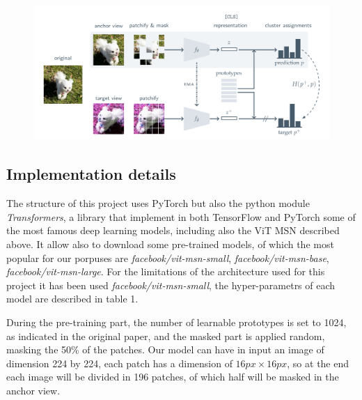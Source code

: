 \documentclass[column]{article}
\begin{document}
	
	\begin{figure}[h]
		\centering
		\includegraphics[width=\textwidth]{Images/screenshot001}
		\caption[MSN workflow]{}
		\label{fig:screenshot001}
	\end{figure}
	
	\begin{multicols}{2}
		
		
	\section{Implementation details}
	
	The structure of this project uses PyTorch but also the python module \textit{Transformers}, a library that implement in both TensorFlow and PyTorch some of the most famous deep learning models, including also
	the ViT MSN described above. It allow also to download some pre-trained models, of which the most popular for our porpuses are \textit{facebook/vit-msn-small}, \textit{facebook/vit-msn-base}, \textit{facebook/vit-msn-large}. For the limitations of the architecture used for this project it has been used \textit{facebook/vit-msn-small}, the hyper-parametrs of each model are described in table 1.
	
	During the pre-training part, the number of learnable prototypes is set to 1024, as indicated in the original paper, and the masked part is applied random, masking the 50\% of the patches. Our model can have in input an image of dimension 224 by 224, each patch has a dimension of $16px \times 16px$, so at the end each image will be divided in 196 patches, of which half will be masked in the anchor view.
		
	\end{multicols}
	
	\begin{table}[ht]
			\centering
		\caption{ViT. models hyper-parameters}
		\label{tab:vit_specs}
	\end{table}
	
\end{document}
